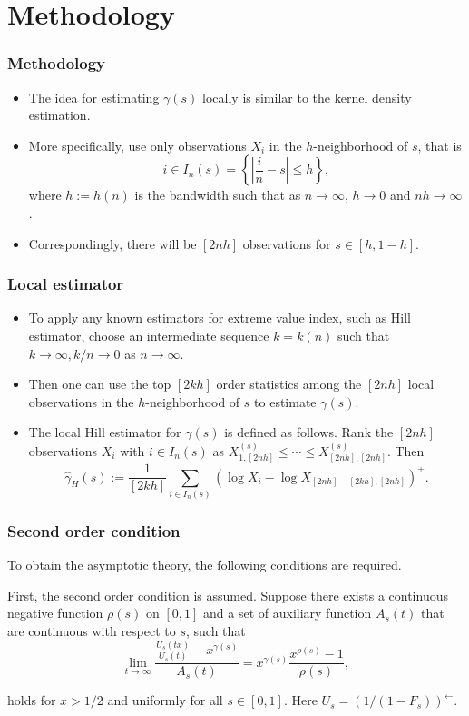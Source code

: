 \documentclass{beamer}
\newcommand{\abs}[1]{\left\vert#1\right\vert}
\newcommand{\set}[1]{\left\{#1\right\}}
\begin{document}
\section{Methodology}

\begin{frame}
    \frametitle{Methodology}
\begin{itemize}
    \item The idea for estimating $\gamma(s)$ locally is similar to the kernel density estimation.
    \medskip
    \item More specifically, use only observations $X_i$ in the $h$-neighborhood of $s$, that is 
    $$
i\in I_n(s)=\set{\abs{\frac{i}{n}-s}\le h},
    $$
    where $h:=h(n)$ is the bandwidth such that as $n\to \infty$, $h \to 0$ and $nh\to \infty$.
    \medskip
\item Correspondingly, there will be $[2nh]$ observations for $s\in [h,1-h]$.
\end{itemize}
\end{frame}

\begin{frame}
    \frametitle{Local estimator}
\begin{itemize}
    \item To apply any known estimators for extreme value index, such as Hill estimator, choose an intermediate sequence $k=k(n)$ such that $k\to \infty, k/n \to 0$ as $n \to \infty$.
    \item Then one can use the top $[2kh]$ order statistics among the $[2nh]$ local observations in the $h$-neighborhood of $s$ to estimate $\gamma(s)$.
    \item The local Hill estimator for $\gamma(s)$ is defined as follows. Rank the $[2nh]$ observations $X_i$ with $i \in I_n(s)$ as $X_{1,[2nh]}^{(s)}\le \cdots \le X_{[2nh],[2nh]}^{(s)}$. Then
    $$
    \hat{\gamma}_{H}(s):=\frac{1}{[2 k h]} \sum_{i \in I_{n}(s)}\left(\log X_{i}-\log X_{[2 n h]-[2 k h],[2 n h]}\right)^{+}.
    $$
\end{itemize}
\end{frame}







\begin{frame} 
    \frametitle{Second order condition}
To obtain the asymptotic theory, the following conditions are required.
   
\bigskip

First, the second order condition is assumed. Suppose there exists a continuous negative function $\rho(s)$ on $[0,1]$ and a set of auxiliary function $A_s(t)$ that are continuous with respect to $s$, such that
\begin{equation}\tag{3}
    \lim _{t \rightarrow \infty} \frac{\frac{U_{s}(t x)}{U_{s}(t)}-x^{\gamma(s)}}{A_{s}(t)}=x^{\gamma(s)} \frac{x^{\rho(s)}-1}{\rho(s)},   
\end{equation}


holds for $x>1/2$ and uniformly for all $s\in [0,1]$. Here $U_s = (1/(1-F_s))^{\leftarrow}$.
\end{frame}
\end{document}
